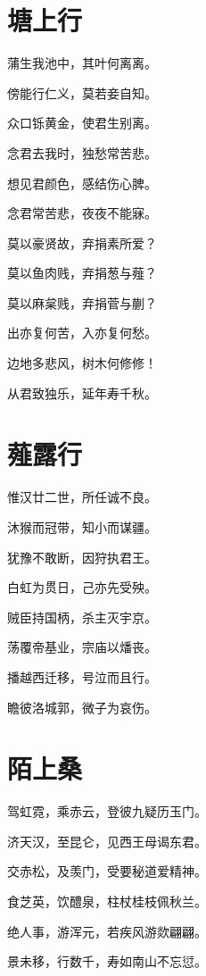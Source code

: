 \documentclass[12pt,a4paper]{ctexbook}
\begin{document}
\section{塘上行}
蒲生我池中，其叶何离离。\par
傍能行仁义，莫若妾自知。\par
众口铄黄金，使君生别离。\par
念君去我时，独愁常苦悲。\par
想见君颜色，感结伤心脾。\par
念君常苦悲，夜夜不能寐。\par
莫以豪贤故，弃捐素所爱？\par
莫以鱼肉贱，弃捐葱与薤？\par
莫以麻枲贱，弃捐菅与蒯？\par
出亦复何苦，入亦复何愁。\par
边地多悲风，树木何修修！\par
从君致独乐，延年寿千秋。\par

\section{薤露行}
惟汉廿二世，所任诚不良。\par
沐猴而冠带，知小而谋疆。\par
犹豫不敢断，因狩执君王。\par
白虹为贯日，己亦先受殃。\par
贼臣持国柄，杀主灭宇京。\par
荡覆帝基业，宗庙以燔丧。\par
播越西迁移，号泣而且行。\par
瞻彼洛城郭，微子为哀伤。\par

\section{陌上桑}
驾虹霓，乘赤云，登彼九疑历玉门。\par
济天汉，至昆仑，见西王母谒东君。\par
交赤松，及羡门，受要秘道爱精神。\par
食芝英，饮醴泉，柱杖桂枝佩秋兰。\par
绝人事，游浑元，若疾风游欻翩翩。\par
景未移，行数千，寿如南山不忘愆。\par
\end{document}
